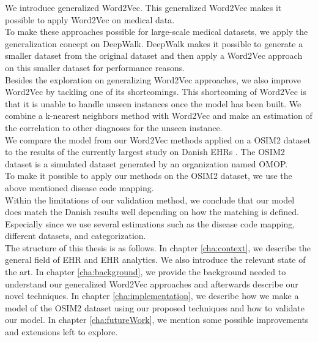 We introduce generalized Word2Vec. This generalized Word2Vec makes it possible to apply Word2Vec on medical data. \\
To make these approaches possible for large-scale medical datasets, we apply the generalization concept on DeepWalk. DeepWalk makes it possible to generate a smaller dataset from the original dataset and then apply a Word2Vec approach on this smaller dataset for performance reasons. \\
Besides the exploration on generalizing Word2Vec approaches, we also improve Word2Vec by tackling one of its shortcomings. This shortcoming of Word2Vec is that it is unable to handle unseen instances once the model has been built. We combine a k-nearest neighbors method with Word2Vec and make an estimation of the correlation to other diagnoses for the unseen instance. \\

We compare the model from our Word2Vec methods applied on a OSIM2 dataset to the results of the currently largest study on Danish EHRs \cite{Brunak:article}. The OSIM2 dataset is a simulated dataset generated by an organization named OMOP. \\
To make it possible to apply our methods on the OSIM2 dataset, we use the above mentioned disease code mapping. \\

Within the limitations of our validation method, we conclude that our model does match the Danish results well depending on how the matching is defined. Especially since we use several estimations such as the disease code mapping, different datasets, and categorization. \\

The structure of this thesis is as follows. In chapter \ref{cha:context}, we describe the general field of EHR and EHR analytics. We also introduce the relevant state of the art. In chapter \ref{cha:background}, we provide the background needed to understand our generalized Word2Vec approaches and afterwards describe our novel techniques. In chapter \ref{cha:implementation}, we describe how we make a model of the OSIM2 dataset using our proposed techniques and how to validate our model. In chapter \ref{cha:futureWork}, we mention some possible improvements and extensions left to explore.

